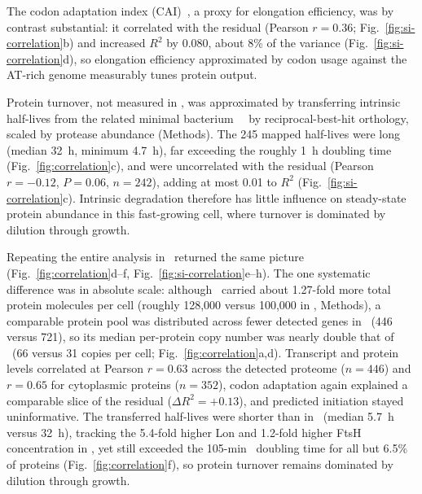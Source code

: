 The codon adaptation index (CAI)~\cite{sharp_codon_1987}, a proxy for elongation efficiency, was by contrast substantial: it correlated with the residual (Pearson $r = 0.36$; Fig.~\ref{fig:si-correlation}b) and increased $R^{2}$ by 0.080, about 8\% of the variance (Fig.~\ref{fig:si-correlation}d), so elongation efficiency approximated by codon usage against the AT-rich genome measurably tunes protein output.

Protein turnover, not measured in \syn, was approximated by transferring intrinsic half-lives from the related minimal bacterium~\mpn~\cite{burgos_protein_2020} by reciprocal-best-hit orthology, scaled by protease abundance (Methods).
The 245 mapped half-lives were long (median 32~h, minimum 4.7~h), far exceeding the roughly 1~h doubling time (Fig.~\ref{fig:correlation}c), and were uncorrelated with the residual (Pearson $r = -0.12$, $P = 0.06$, $n = 242$), adding at most 0.01 to $R^{2}$ (Fig.~\ref{fig:si-correlation}c).
Intrinsic degradation therefore has little influence on steady-state protein abundance in this fast-growing cell, where turnover is dominated by dilution through growth.

Repeating the entire analysis in \syna~returned the same picture (Fig.~\ref{fig:correlation}d--f, Fig.~\ref{fig:si-correlation}e--h).
The one systematic difference was in absolute scale: although \syn~carried about 1.27-fold more total protein molecules per cell (roughly 128{,}000 versus 100{,}000 in \syna, Methods), a comparable protein pool was distributed across fewer detected genes in \syna~(446 versus 721), so its median per-protein copy number was nearly double that of \syn~(66 versus 31 copies per cell; Fig.~\ref{fig:correlation}a,d).
Transcript and protein levels correlated at Pearson $r = 0.63$ across the detected proteome ($n = 446$) and $r = 0.65$ for cytoplasmic proteins ($n = 352$), codon adaptation again explained a comparable slice of the residual ($\Delta R^{2} = +0.13$), and predicted initiation stayed uninformative.
The transferred half-lives were shorter than in \syn~(median 5.7~h versus 32~h), tracking the 5.4-fold higher Lon and 1.2-fold higher FtsH concentration in \syna, yet still exceeded the 105-min \syna~doubling time for all but 6.5\% of proteins (Fig.~\ref{fig:correlation}f), so protein turnover remains dominated by dilution through growth.

